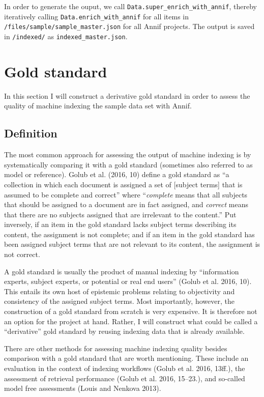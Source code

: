 In order to generate the ouput, we call
\texttt{Data.super\_enrich\_with\_annif}, thereby iteratively calling
\texttt{Data.enrich\_with\_annif} for all items in
\texttt{/files/sample/sample\_master.json} for all Annif projects. The
output is saved in \texttt{/indexed/} as \texttt{indexed\_master.json}.

\hypertarget{gold-standard}{%
\section{Gold standard}\label{gold-standard}}

In this section I will construct a derivative gold standard in order to
assess the quality of machine indexing the sample data set with Annif.

\hypertarget{definition}{%
\subsection{Definition}\label{definition}}

The most common approach for assessing the output of machine indexing is
by systematically comparing it with a gold standard (sometimes also
referred to as model or reference). Golub et al. (2016, 10) define a
gold standard as ``a collection in which each document is assigned a set
of {[}subject terms{]} that is assumed to be complete and correct''
where ``\emph{complete} means that all subjects that should be assigned
to a document are in fact assigned, and \emph{correct} means that there
are no subjects assigned that are irrelevant to the content.'' Put
inversely, if an item in the gold standard lacks subject terms
describing its content, the assignment is not complete; and if an item
in the gold standard has been assigned subject terms that are not
relevant to its content, the assignment is not correct.

A gold standard is usually the product of manual indexing by
``information experts, subject experts, or potential or real end users''
(Golub et al. 2016, 10). This entails its own host of epistemic problems
relating to objectivity and consistency of the assigned subject terms.
Most importantly, however, the construction of a gold standard from
scratch is very expensive. It is therefore not an option for the project
at hand. Rather, I will construct what could be called a ``derivative''
gold standard by reusing indexing data that is already available.

There are other methods for assessing machine indexing quality besides
comparison with a gold standard that are worth mentioning. These include
an evaluation in the context of indexing workflows (Golub et al. 2016,
13ff.), the assessment of retrieval performance (Golub et al. 2016,
15--23.), and so-called model free assessments (Louis and Nenkova 2013).

